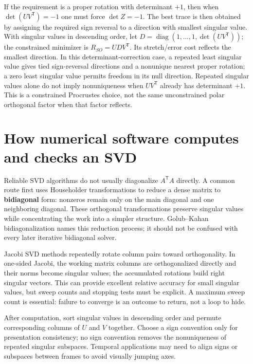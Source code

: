 If the requirement is a proper rotation with determinant \(+1\), then when \(\det(UV^\mathsf T)=-1\) one must force \(\det Z=-1\). The best trace is then obtained by assigning the required sign reversal to a direction with smallest singular value. With singular values in descending order, let \(D=\operatorname{diag}(1,\ldots,1,\det(UV^\mathsf T))\); the constrained minimizer is \(R_{SO}=UDV^\mathsf T\). Its stretch/error cost reflects the smallest direction. In this determinant-correction case, a repeated least singular value gives tied sign-reversal directions and a nonunique nearest proper rotation; a zero least singular value permits freedom in its null direction. Repeated singular values alone do not imply nonuniqueness when \(UV^\mathsf T\) already has determinant \(+1\). This is a constrained Procrustes choice, not the same unconstrained polar orthogonal factor when that factor reflects.

\section{How numerical software computes and checks an SVD}\label{02-foundations-ii-ch024-how-numerical-software-computes-and-checks-an-svd}

Reliable SVD algorithms do not usually diagonalize \(A^\mathsf T A\) directly. A common route first uses Householder transformations to reduce a dense matrix to \textbf{bidiagonal} form: nonzeros remain only on the main diagonal and one neighboring diagonal. These orthogonal transformations preserve singular values while concentrating the work into a simpler structure. Golub--Kahan bidiagonalization names this reduction process; it should not be confused with every later iterative bidiagonal solver.

Jacobi SVD methods repeatedly rotate column pairs toward orthogonality. In one-sided Jacobi, the working matrix columns are orthogonalized directly and their norms become singular values; the accumulated rotations build right singular vectors. This can provide excellent relative accuracy for small singular values, but sweep counts and stopping tests must be explicit. A maximum sweep count is essential: failure to converge is an outcome to return, not a loop to hide.

After computation, sort singular values in descending order and permute corresponding columns of \(U\) and \(V\) together. Choose a sign convention only for presentation consistency; no sign convention removes the nonuniqueness of repeated singular subspaces. Temporal applications may need to align signs or subspaces between frames to avoid visually jumping axes.

